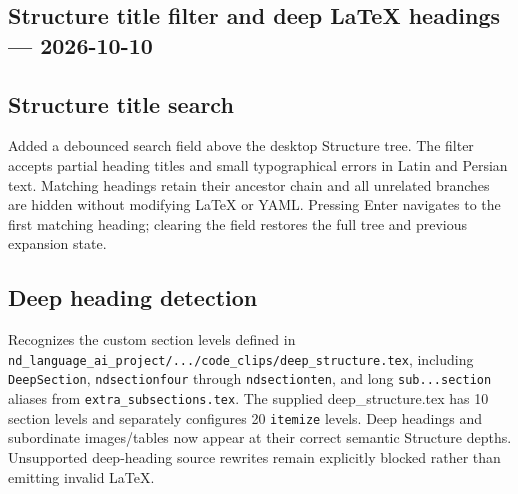 \documentclass[a4paper]{article}
\title{}
\date{}
\author{Mohammad Rahmani}
\begin{document}
   \maketitle

   \begin{preview}
\section*{Structure title filter and deep LaTeX headings --- 2026-10-10}
\subsection*{Structure title search}
Added a debounced search field above the desktop Structure tree. The filter
accepts partial heading titles and small typographical errors in Latin and
Persian text. Matching headings retain their ancestor chain and all unrelated
branches are hidden without modifying LaTeX or YAML. Pressing Enter navigates
to the first matching heading; clearing the field restores the full tree and
previous expansion state.

\subsection*{Deep heading detection}
Recognizes the custom section levels defined in
\texttt{nd\_language\_ai\_project/.../code\_clips/deep\_structure.tex},
including \texttt{DeepSection}, \texttt{ndsectionfour} through
\texttt{ndsectionten}, and long \texttt{sub...section} aliases from
\texttt{extra\_subsections.tex}. The supplied deep\_structure.tex has
10 section levels and separately configures 20 \texttt{itemize} levels.
Deep headings and subordinate images/tables now appear at their correct
semantic Structure depths. Unsupported deep-heading source rewrites remain
explicitly blocked rather than emitting invalid LaTeX.

   \end{preview}

   
   
\end{document}
